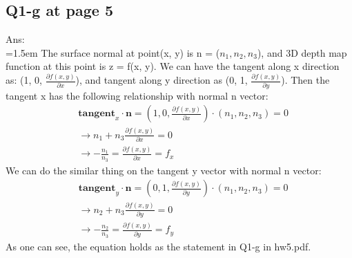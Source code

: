 \documentclass{article}
\begin{document}
	\newpage
	\subsection*{Q1-g at page 5}
	Ans:\\
	\hangindent=1.5em \hspace{1.5em} The surface normal at point(x, y) is n = ($n_1, n_2, n_3$), and 3D depth map function at this point is z = f(x, y). We can have the tangent along x direction as: (1, 0, $\frac{\partial f(x, y)}{\partial x}$), and tangent along y direction as (0, 1, $\frac{\partial f(x, y)}{\partial y}$). Then the tangent x has the following relationship with normal n vector: \\
	\begin{align}
	&\mathbf{tangent}_x \cdot \mathbf{n} = (1, 0, \frac{\partial f(x, y)}{\partial x}) \cdot (n_1, n_2, n_3) = 0 \\
	&\rightarrow n_1 + n_3 \frac{\partial f(x, y)}{\partial x} = 0 \\
	&\rightarrow -\frac{n_1}{n_3} = \frac{\partial f(x, y)}{\partial x} = f_x
	\end{align}
	\vspace{1em}
	We can do the similar thing on the tangent y vector with normal n vector: \\
	\begin{align}
	&\mathbf{tangent}_y \cdot \mathbf{n} = (0, 1, \frac{\partial f(x, y)}{\partial y}) \cdot (n_1, n_2, n_3) = 0 \\
	&\rightarrow n_2 + n_3 \frac{\partial f(x, y)}{\partial y} = 0 \\
	&\rightarrow -\frac{n_2}{n_3} = \frac{\partial f(x, y)}{\partial y} = f_y
	\end{align}
	As one can see, the equation holds as the statement in Q1-g in hw5.pdf.
	
	\newpage
\end{document}
